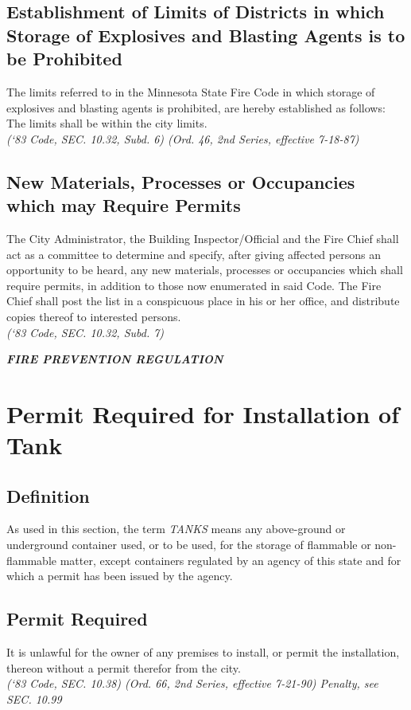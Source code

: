 \documentclass[code.tex]{subfiles}
\begin{document}
\subsection{Establishment of Limits of Districts in which Storage of Explosives and Blasting Agents is to be Prohibited}
The limits referred to in the Minnesota State Fire Code in which storage of explosives and blasting agents is prohibited, are hereby established as follows: The limits shall be within the city limits.\\
\emph{(‘83 Code, SEC. 10.32, Subd. 6)  (Ord. 46, 2nd Series, effective 7-18-87)}
\subsection{New Materials, Processes or Occupancies which may Require Permits}
The City Administrator, the Building Inspector/Official and the Fire Chief shall act as a committee to determine and specify, after giving affected persons an opportunity to be heard, any new materials, processes or occupancies which shall require permits, in addition to those now enumerated in said Code. The Fire Chief shall post the list in a conspicuous place in his or her office, and distribute copies thereof to interested persons.\\
\emph{(‘83 Code, SEC. 10.32, Subd. 7)}

\begin{center}
\emph{\textbf{\LARGE{FIRE PREVENTION REGULATION}}}
\end{center}

\setcounter{section}{14}
\section{Permit Required for Installation of Tank}
\subsection{Definition}
As used in this section, the term \emph{TANKS} means any above-ground or underground container used, or to be used, for the storage of flammable or non-flammable matter, except containers regulated by an agency of this state and for which a permit has been issued by the agency.
\subsection{Permit Required}
It is unlawful for the owner of any premises to install, or permit the installation, thereon without a permit therefor from the city.\\
\emph{(‘83 Code, SEC. 10.38)  (Ord. 66, 2nd Series, effective 7-21-90)  Penalty, see SEC. 10.99}
\end{document}
